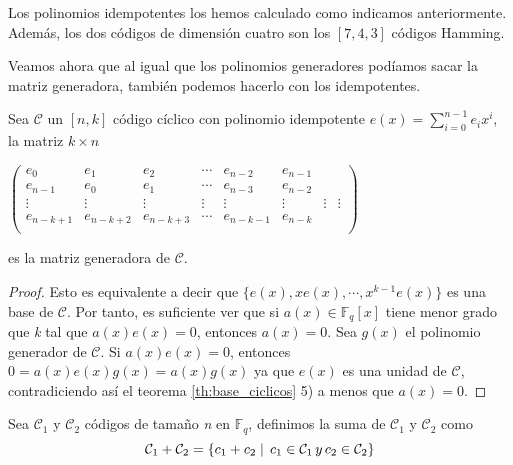 \begin{exampleth}
\begin{tabular}{ c | c | c |}
	\end{tabular}

Los polinomios idempotentes los hemos calculado como indicamos anteriormente. Además, los dos códigos de dimensión cuatro son los $[7,4,3]$ códigos Hamming.

\end{exampleth}


Veamos ahora que al igual que los polinomios generadores podíamos sacar la matriz generadora, también podemos hacerlo con los idempotentes.

\begin{theorem}
Sea $\mathcal{C}$ un $[n,k]$ código cíclico con polinomio idempotente $e(x)= \sum_{i=0}^{n-1} e_ix^i$, la matriz $k \times n $

$ \begin{pmatrix}
			e_0 & e_1 & e_2 & \cdots & e_{n-2} & e_{n-1} \\
			e_{n-1} & e_0 & e_1 & \cdots  & e_{n-3} & e_{n-2} \\
			\vdots & \vdots & \vdots & \vdots & \vdots &\vdots & \vdots & \vdots \\
			e_{n-k+1} & e_{n-k+2} & e_{n-k+3} & \cdots  & e_{n-k-1} & e_{n-k} \\
	\end{pmatrix}$

es la matriz generadora de $\mathcal{C}$.
\end{theorem}

\begin{proof}
Esto es equivalente a decir que $\{ e(x),xe(x),\cdots,x^{k-1}e(x) \}$ es una base de $\mathcal{C}$. Por tanto,  es suficiente ver que si $a(x) \in \mathbb{F}_q[x]$ tiene menor grado que \textit{k} tal que $a(x)e(x)=0$, entonces $a(x)=0$. Sea $g(x)$ el polinomio generador de $\mathcal{C}$. Si $a(x)e(x)=0$, entonces $0 = a(x)e(x)g(x)= a(x)g(x)$ ya que $e(x)$ es una unidad de $\mathcal{C}$, contradiciendo así el teorema \ref{th:base_ciclicos} 5) a menos que $a(x) = 0$.
\end{proof}


\begin{definition}
Sea $\mathcal{C}_1$ y $\mathcal{C}_2$ códigos de tamaño \textit{n} en $\mathbb{F}_q$, definimos la suma de $\mathcal{C}_1$ y $\mathcal{C}_2$ como 
\[
\mathcal{C}_1 + \mathcal{C}_2 = \{ c_1 + c_2 \mid \thinspace c_1 \in \mathcal{C}_1 \thinspace y \thinspace c_2 \in \mathcal{C}_2 \}
\]
\end{definition}

